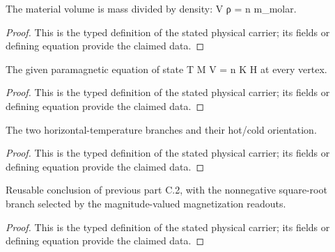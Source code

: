 \begin{definition}
  \label{def:physics:IPhO_2026_3_C_3:aux014}
  The material volume is mass divided by density: V ρ = n m\_molar.
\end{definition}
\begin{proof}
  This is the typed definition of the stated physical carrier; its fields or defining equation provide the claimed data.
\end{proof}

\begin{definition}
  \label{def:physics:IPhO_2026_3_C_3:aux015}
  The given paramagnetic equation of state T M V = n K H at every vertex.
\end{definition}
\begin{proof}
  This is the typed definition of the stated physical carrier; its fields or defining equation provide the claimed data.
\end{proof}

\begin{definition}
  \label{def:physics:IPhO_2026_3_C_3:aux016}
  The two horizontal-temperature branches and their hot/cold orientation.
\end{definition}
\begin{proof}
  This is the typed definition of the stated physical carrier; its fields or defining equation provide the claimed data.
\end{proof}

\begin{definition}
  \label{def:physics:IPhO_2026_3_C_3:aux017}
  Reusable conclusion of previous part C.2, with the nonnegative square-root branch selected by the magnitude-valued magnetization readouts.
\end{definition}
\begin{proof}
  This is the typed definition of the stated physical carrier; its fields or defining equation provide the claimed data.
\end{proof}

